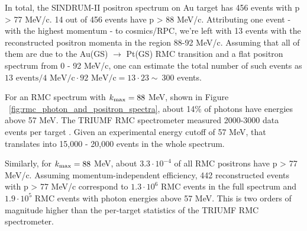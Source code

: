 \documentclass[12pt]{article}
\newcommand {\ra}        {\rightarrow}
\newcommand {\kmax}      {\mbox{$k_{\rm max}$}}
\begin{document}
In total, the SINDRUM-II positron spectrum on Au target has 456 events with p > 77 MeV/c.
14 out of 456 events have p > 88 MeV/c. Attributing one event - with the highest
momentum - to cosmics/RPC, we're left with 13 events with the reconstructed positron
momenta in the region 88-92 MeV/c. Assuming that all of them are due to the
Au(GS) $\ra$ Pt(GS) RMC transition and a flat positron spectrum from 0 - 92 MeV/c,
one can estimate the total number of such events as $13\text{ events}/4\text{ MeV/c}\cdot 92\text{ MeV/c} = 13\cdot 23 \sim\ 300$ events.

For an RMC spectrum with $\kmax = 88$ MeV, shown in Figure ~\ref{fig:rmc_photon_and_positron_spectra}, 
about 14\% of photons have energies above 57 MeV.
The TRIUMF RMC spectrometer measured 2000-3000 data events per target \cite{RMC_1999_PhysRevC.59.2853}.
Given an experimental energy cutoff of 57 MeV, that translates into 15,000 - 20,000
events in the whole spectrum. 

Similarly, for $\kmax= 88$ MeV, about $3.3\cdot 10^{-4}$ of all RMC positrons have
p > 77 MeV/c. Assuming momentum-independent efficiency, 442 reconstructed events
with p > 77 MeV/c correspond to $1.3\cdot 10^6$ RMC events in the full spectrum
and $1.9\cdot 10^5$ RMC events with photon energies above 57 MeV. This is two orders
of magnitude higher than the per-target statistics of the TRIUMF RMC spectrometer.
\end{document}
